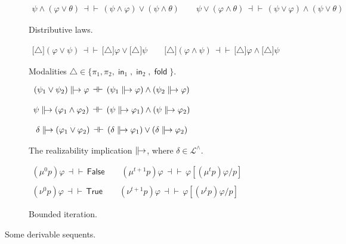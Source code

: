 \documentclass[%
  a4paper,
  UKenglish,
  cleveref,
  autoref,
  thm-restate,
  numberwithinsect,
]{lipics-v2021}
\newcommand\defthesisiff{\dashv\vdash}
\newcommand\thesisiff{\mathrel{\defthesisiff}}
\newcommand\temp[1]{\mathsf{#1}}
\newcommand\True{\temp{True}}
\newcommand\False{\temp{False}}
\newcommand\term[1]{\mathsf{#1}}
\newcommand\inj{\mathop{\term{in}}}
\newcommand\fold{\mathop{\term{fold}}}
\newcommand\defrealto{\mathrel\parallel\joinrel\to}
\newcommand\realto{\mathrel{\defrealto}}
\newcommand\FP{p}
\newcommand\finmu{\mu}
\newcommand\finnu{\nu}
\newcommand\Lang{\mathcal{L}}
\newcommand\form[1]{\lbrack #1 \rbrack}
\newcommand\modgen{\mathord{\triangle}}	%
\begin{document}
\begin{figure}[t!]
\begin{subfigure}{\textwidth}
\centering
\(
\begin{array}{c}
%
  \psi \land (\varphi \lor \theta)
  \,\thesisiff\,
  (\psi \land \varphi) \lor (\psi \land \theta)
%
\qquad
%
  \psi \lor (\varphi \land \theta)
  \,\thesisiff\,
  (\psi \lor \varphi) \land (\psi \lor \theta)
%
\end{array}
\)
\caption{Distributive laws.%
\label{fig:proof:log:der:distr}}
\end{subfigure}

\begin{subfigure}{\textwidth}
\centering
\(
\begin{array}{c}
%
  \form{\modgen}(\varphi \lor \psi)
  \,\thesisiff\,
  \form{\modgen}\varphi \lor \form{\modgen}\psi
%
\qquad
%
  \form{\modgen}(\varphi \land \psi)
  \,\thesisiff\,
  \form{\modgen}\varphi \land \form{\modgen}\psi
%
\end{array}
\)
\caption{Modalities $\modgen \in \{\pi_1, \pi_2, \inj_1, \inj_2, \fold\}$.%
\label{fig:proof:log:der:mod}}
\end{subfigure}

\begin{subfigure}{\textwidth}
\centering
\(
\begin{array}{c}
%
  (\psi_1 \lor \psi_2) \realto \varphi
  \,\thesisiff\,
  (\psi_1 \realto \varphi) \land (\psi_2 \realto \varphi)
%
\\\\
%
  \psi \realto (\varphi_1 \land \varphi_2)
  \,\thesisiff\,
  (\psi \realto \varphi_1) \land (\psi \realto \varphi_2)
%
\\\\
%
  \delta \realto (\varphi_1 \lor \varphi_2)
  \,\thesisiff\,
  (\delta \realto \varphi_1) \lor (\delta \realto \varphi_2)
%
\end{array}
\)
\caption{The realizability implication $\realto$,
where $\delta \in \Lang^\land$.%
\label{fig:proof:log:der:realto}}
\end{subfigure}

\begin{subfigure}{\textwidth}
\centering
\(
\begin{array}{c}
%
  (\finmu^0 \FP)\varphi
  \,\thesisiff\,
  \False
%
\qquad
%
  (\finmu^{t+1} \FP)\varphi
  \,\thesisiff\,
  \varphi[(\finmu^t \FP)\varphi / \FP]
%
\\\\
%
  (\finnu^0 \FP)\varphi
  \,\thesisiff\,
  \True
%
\qquad
%
  (\finnu^{t+1} \FP)\varphi
  \,\thesisiff\,
  \varphi[(\finnu^t \FP)\varphi / \FP]
%
\end{array}
\)
\caption{Bounded iteration.%
\label{fig:proof:log:der:iter}}
\end{subfigure}

\caption{Some derivable sequents.%
\label{fig:proof:log:der}}
\end{figure}
\end{document}
